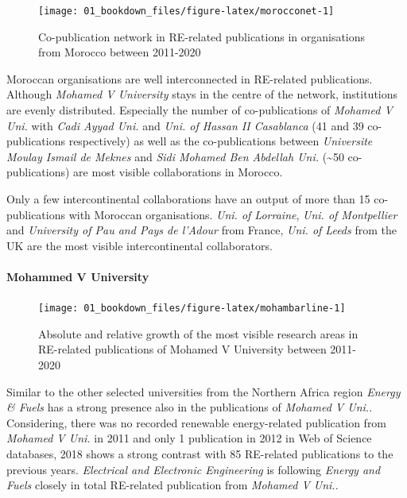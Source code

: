 \documentclass[
]{book}
\begin{document}
\begin{figure}
\texttt{[image: 01\_bookdown\_files/figure-latex/morocconet-1]} \caption{Co-publication network in RE-related publications in organisations from Morocco between 2011-2020}\label{fig:morocconet}
\end{figure}

Moroccan organisations are well interconnected in RE-related publications. Although \emph{Mohamed V University} stays in the centre of the network, institutions are evenly distributed. Especially the number of co-publications of \emph{Mohamed V Uni.} with \emph{Cadi Ayyad Uni.} and \emph{Uni. of Hassan II Casablanca} (41 and 39 co-publications respectively) as well as the co-publications between \emph{Universite Moulay Ismail de Meknes} and \emph{Sidi Mohamed Ben Abdellah Uni.} (\textasciitilde50 co-publications) are most visible collaborations in Morocco.

Only a few intercontinental collaborations have an output of more than 15 co-publications with Moroccan organisations. \emph{Uni. of Lorraine}, \emph{Uni. of Montpellier} and \emph{University of Pau and Pays de l'Adour} from France, \emph{Uni. of Leeds} from the UK are the most visible intercontinental collaborators.

\hypertarget{mohammed-v-university}{%
\paragraph{Mohammed V University}\label{mohammed-v-university}}

\begin{figure}
\texttt{[image: 01\_bookdown\_files/figure-latex/mohambarline-1]} \caption{Absolute and relative growth of the most visible research areas in RE-related publications of Mohamed V University between 2011-2020}\label{fig:mohambarline}
\end{figure}

Similar to the other selected universities from the Northern Africa region \emph{Energy \& Fuels} has a strong presence also in the publications of \emph{Mohamed V Uni.}. Considering, there was no recorded renewable energy-related publication from \emph{Mohamed V Uni.} in 2011 and only 1 publication in 2012 in Web of Science databases, 2018 shows a strong contrast with 85 RE-related publications to the previous years. \emph{Electrical and Electronic Engineering} is following \emph{Energy and Fuels} closely in total RE-related publication from \emph{Mohamed V Uni.}.
\end{document}
